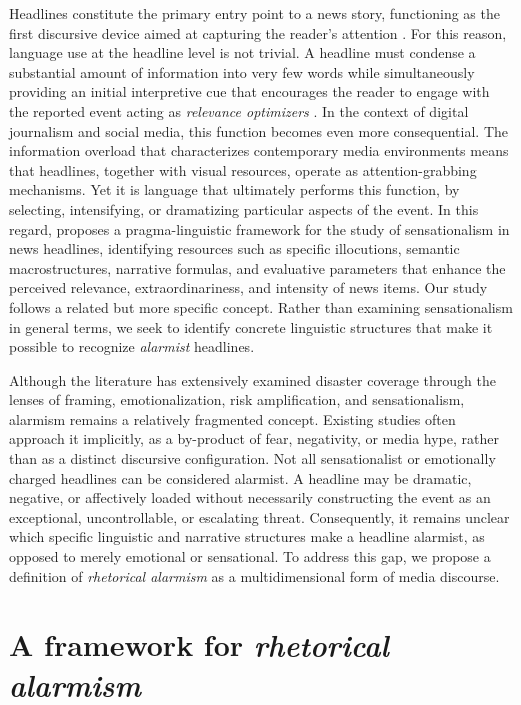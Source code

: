 Headlines constitute the primary entry point to a news story, functioning as the first discursive device aimed at capturing the reader’s attention \parencite{Kuiken_Digital_News}. 
For this reason, language use at the headline level is not trivial. A headline must condense a substantial amount of information into very few words while simultaneously 
providing an initial interpretive cue that encourages the reader to engage with the reported event acting as \emph{relevance optimizers} \parencite{Dor_Relevance_Opti}. In the context of digital 
journalism and social media, this function becomes even more consequential. The information overload that characterizes 
contemporary media environments means that headlines, together with visual resources, operate as attention-grabbing mechanisms. Yet it is language 
that ultimately performs this function, by selecting, intensifying, or dramatizing particular aspects of the event. In this regard, \textcite{pragma_linguistic} proposes a 
pragma-linguistic framework for the study of sensationalism in news headlines, identifying resources such as specific illocutions, semantic macrostructures, 
narrative formulas, and evaluative parameters that enhance the perceived relevance, extraordinariness, and intensity of news items. Our study follows a related but 
more specific concept. Rather than examining sensationalism in general terms, we seek to identify concrete 
linguistic structures that make it possible to recognize \emph{alarmist} headlines.

Although the literature has extensively examined disaster coverage through the lenses of framing, emotionalization, risk amplification,
and sensationalism, alarmism remains a relatively fragmented concept. Existing studies often approach it implicitly, as a by-product of fear, 
negativity, or media hype, rather than as a distinct discursive configuration. Not all sensationalist or emotionally charged headlines 
can be considered alarmist. A headline may be dramatic, negative, or affectively loaded without necessarily constructing the event as an exceptional,
uncontrollable, or escalating threat. Consequently, it remains unclear which specific linguistic and narrative structures make a headline alarmist, 
as opposed to merely emotional or sensational. To address this gap, we propose a definition of \emph{rhetorical alarmism} as a
multidimensional form of media discourse.

\section{A framework for \emph{rhetorical alarmism}}

